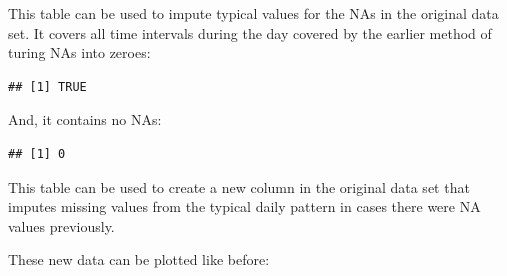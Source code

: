 \documentclass[]{article}
\newenvironment{Shaded}{\begin{snugshade}}{\end{snugshade}}
\newcommand{\KeywordTok}[1]{\textcolor[rgb]{0.13,0.29,0.53}{\textbf{{#1}}}}
\newcommand{\DataTypeTok}[1]{\textcolor[rgb]{0.13,0.29,0.53}{{#1}}}
\newcommand{\StringTok}[1]{\textcolor[rgb]{0.31,0.60,0.02}{{#1}}}
\newcommand{\NormalTok}[1]{{#1}}
\begin{document}
This table can be used to impute typical values for the NAs in the
original data set. It covers all time intervals during the day covered
by the earlier method of turing NAs into zeroes:

\begin{Shaded}
\end{Shaded}

\begin{verbatim}
## [1] TRUE
\end{verbatim}

And, it contains no NAs:

\begin{Shaded}
\end{Shaded}

\begin{verbatim}
## [1] 0
\end{verbatim}

This table can be used to create a new column in the original data set
that imputes missing values from the typical daily pattern in cases
there were NA values previously.

\begin{Shaded}
\end{Shaded}

These new data can be plotted like before:
\end{document}
